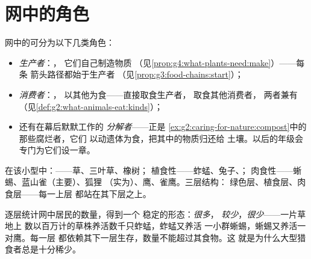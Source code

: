 \section{网中的角色}

\begin{definition}[生产者与消费者]\label{def:g5:food-webs:roles}
网中的可分为以下几类角色：
\begin{itemize}
  \item \emph{生产者}：，
        它们自己制造物质
        （见\cref{prop:g4:what-plants-need:make}）——每条
        箭头路径都始于生产者
        （见\cref{prop:g3:food-chains:start}）；
  \item \emph{消费者}：，
        以其他为食——直接取食生产者，
        取食其他消费者，
        两者兼有（见\cref{def:g2:what-animals-eat:kinds}）；
  \item 还有在幕后默默工作的
        \emph{分解者}——正是
        \cref{ex:g2:caring-for-nature:compost}中的那些腐烂者，它们
        以动遗体为食，把其中的物质归还给
        土壤。以后的年级会专门为它们设一章。
\end{itemize}
\end{definition}

\begin{example}[图中生物的分类]\label{ex:g5:food-webs:sorting}
在该小型中：——草、三叶草、橡树；
植食性——蚱蜢、兔子、；
肉食性——蜥蜴、蓝山雀（主要）、狐狸
（实为）、鹰、雀鹰。三层结构：
绿色层、植食层、肉食层——每一上层
都站在其下层之上。
\end{example}

\begin{proposition}[数量的金字塔形状]\label{prop:g5:food-webs:pyramid}
逐层统计网中居民的数量，得到一个
稳定的形态：\emph{很多}，
\emph{较少}，\emph{很少}——一片草地上
数以百万计的草株养活数千只蚱蜢，蚱蜢又养活
一小群蜥蜴，蜥蜴又养活一对鹰。每一层
都依赖其下一层生存，数量不能超过其食物。这
就是为什么大型猎食者总是十分稀少。
\end{proposition}
\admitted

